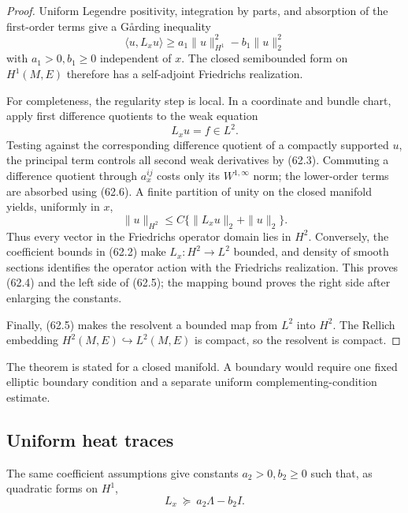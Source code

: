 \documentclass[11pt]{article}
\theoremstyle{remark}
\begin{document}
\begin{proof}
Uniform Legendre positivity, integration by parts, and absorption of
the first-order terms give a G{\aa}rding inequality
\begin{equation}
 \langle u,L_xu\rangle
 \geq
 a_1\|u\|_{H^1}^2-b_1\|u\|_2^2                  \tag{62.6}
\end{equation}
with \(a_1>0,b_1\geq0\) independent of \(x\).  The closed
semibounded form on \(H^1(M,E)\) therefore has a self-adjoint
Friedrichs realization.

For completeness, the regularity step is local.  In a coordinate
and bundle chart, apply first difference quotients to the weak
equation
\[
                         L_xu=f\in L^2.
\]
Testing against the corresponding difference quotient of a compactly
supported \(u\), the principal term controls all second weak
derivatives by (62.3).  Commuting a difference quotient through
\(a_x^{ij}\) costs only its \(W^{1,\infty}\) norm; the lower-order
terms are absorbed using (62.6).  A finite partition of unity on the
closed manifold yields, uniformly in \(x\),
\begin{equation}
 \|u\|_{H^2}
 \leq C\{\|L_xu\|_2+\|u\|_2\}.                   \tag{62.7}
\end{equation}
Thus every vector in the Friedrichs operator domain lies in \(H^2\).
Conversely, the coefficient bounds in (62.2) make
\(L_x:H^2\to L^2\) bounded, and density of smooth sections identifies
the operator action with the Friedrichs realization.  This proves
(62.4) and the left side of (62.5); the mapping bound proves the
right side after enlarging the constants.

Finally, (62.5) makes the resolvent a bounded map from \(L^2\) into
\(H^2\).  The Rellich embedding \(H^2(M,E)\hookrightarrow L^2(M,E)\)
is compact, so the resolvent is compact.
\end{proof}

The theorem is stated for a closed manifold.  A boundary would
require one fixed elliptic boundary condition and a separate
uniform complementing-condition estimate.

\subsection{Uniform heat traces}

The same coefficient assumptions give constants \(a_2>0,b_2\geq0\)
such that, as quadratic forms on \(H^1\),
\begin{equation}
                         L_x\ \succeq\ a_2\Lambda-b_2I.       \tag{62.8}
\end{equation}
\end{document}
